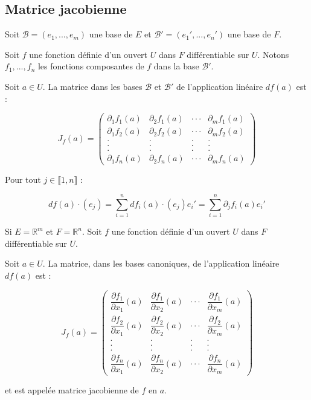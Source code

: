\documentclass[a4paper,12pt]{book}
\newcommand{\Def}[2]{\begin{tcolorbox}[sharp corners, colback=white,colframe=blue!90!black!75, title=Définition : #1]#2\end{tcolorbox}}
\newcommand{\Prop}[2]{\begin{tcolorbox}[sharp corners, colback=white,colframe=red!90!black!75, title=Proposition : #1]#2\end{tcolorbox}}
\newcommand{\Pre}[1]{\begin{tcolorbox}[sharp corners, colback=white,colframe=green!60!green!30!black!75, title=Preuve]#1\end{tcolorbox}}
\def\R{\mathbb{R}}
\begin{document}
\subsection{Matrice jacobienne}
\Prop{}{Soit $\mathcal{B}=(e_1,..., e_m)$ une base de $E$ et $\mathcal{B}'=(e_1',..., e_n')$ une base de $F$.
\par Soit $f$ une fonction définie d'un ouvert $U$ dans $F$ différentiable sur $U$. Notons $f_1,..., f_n$ les fonctions composantes de $f$ dans la base $\mathcal{B}'$.
\par Soit $a\in U$. La matrice dans les bases $\mathcal{B}$ et $\mathcal{B}'$ de l'application linéaire $df(a)$ est :
\par $$J_f(a) = \begin{pmatrix} \partial_1f_1(a) & \partial_2f_1(a) & \cdot\cdot\cdot & \partial_mf_1(a)
\\ \partial_1f_2(a) & \partial_2f_2(a) & \cdot\cdot\cdot & \partial_mf_2(a)
\\ . & . & . & .
\\ . & . & . & .
\\ . & . & . & .
\\ \partial_1f_n(a) & \partial_2f_n(a) & \cdot\cdot\cdot & \partial_mf_n(a)\end{pmatrix}$$}
\Pre{Pour tout $j\in\llbracket 1,n\rrbracket$ :
\par $$df(a)\cdot (e_j) =\sum\limits_{i=1}^ndf_i(a)\cdot(e_j)e_i' = \sum\limits_{i=1}^n\partial_jf_i(a)e_i'$$}
\Def{Matrice Jacobienne}{Si $E=\R^m$ et $F=\R^n$. Soit $f$ une fonction définie d'un ouvert $U$ dans $F$ différentiable sur $U$.
\par Soit $a\in U$. La matrice, dans les bases canoniques, de l'application linéaire $df(a)$ est :
\par $$J_f(a) = \begin{pmatrix} \dfrac{\partial f_1}{\partial x_1}(a) & \dfrac{\partial f_1}{\partial x_2}(a) & \cdot\cdot\cdot & \dfrac{\partial f_1}{\partial x_m}(a)
\\ \dfrac{\partial f_2}{\partial x_1}(a) & \dfrac{\partial f_2}{\partial x_2}(a) & \cdot\cdot\cdot & \dfrac{\partial f_2}{\partial x_m}(a)
\\ . & . & . & .
\\ . & . & . & .
\\ . & . & . & .
\\ \dfrac{\partial f_n}{\partial x_1}(a) & \dfrac{\partial f_n}{\partial x_2}(a) & \cdot\cdot\cdot & \dfrac{\partial f_n}{\partial x_m}(a)\end{pmatrix}$$
\par et est appelée matrice jacobienne de $f$ en $a$.}
\end{document}
